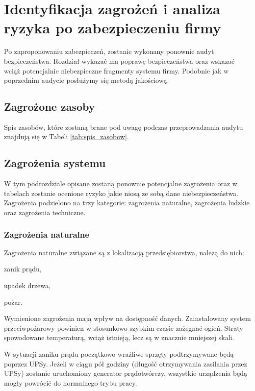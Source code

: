\newpage
\section{Identyfikacja zagrożeń \newline i analiza ryzyka \newline po zabezpieczeniu firmy}
Po zaproponowaniu zabezpieczeń, zostanie wykonany ponownie audyt bezpieczeństwa. Rozdział wykazać ma poprawę bezpieczeństwa oraz wskazać wciąż potencjalnie niebezpieczne fragmenty systemu firmy.
Podobnie jak w poprzednim audycie posłużymy się metodą jakościową.

\subsection{Zagrożone zasoby}
Spis zasobów, które zostaną brane pod uwagę podczas przeprowadzania audytu znajdują się w Tabeli \ref{tab:spis_zasobow}.

\subsection{Zagrożenia systemu}
W tym podrozdziale opisane zostaną ponownie potencjalne zagrożenia oraz w tabelach zostanie ocenione ryzyko jakie niosą ze sobą dane niebezpieczeństwa. Zagrożenia podzielono na trzy kategorie: zagrożenia naturalne, zagrożenia ludzkie oraz zagrożenia techniczne.

\subsubsection{Zagrożenia naturalne} 
Zagrożenia naturalne związane są z lokalizacją przedsiębiorstwa, należą do nich:
\begin{itemize*}
	\item zanik prądu,
	\item upadek drzewa,
	\item pożar.
\end{itemize*}

Wymienione zagrożenia mają wpływ na dostępność danych. Zainstalowany system przeciwpożarowy powinien w stosunkowo szybkim czasie zażegnać ogień. Straty spowodowane temperaturą, wciąż istnieją, lecz są w znacznie mniejszej skali. 

W sytuacji zaniku prądu początkowo wrażliwe sprzęty podtrzymywane będą poprzez UPSy. Jeżeli w ciągu pół godziny (długość otrzymywania zasilania przez UPSy) zostanie uruchomiony generator prądotwórczy, wszystkie urządzenia będą mogły powrócić do normalnego trybu pracy.

